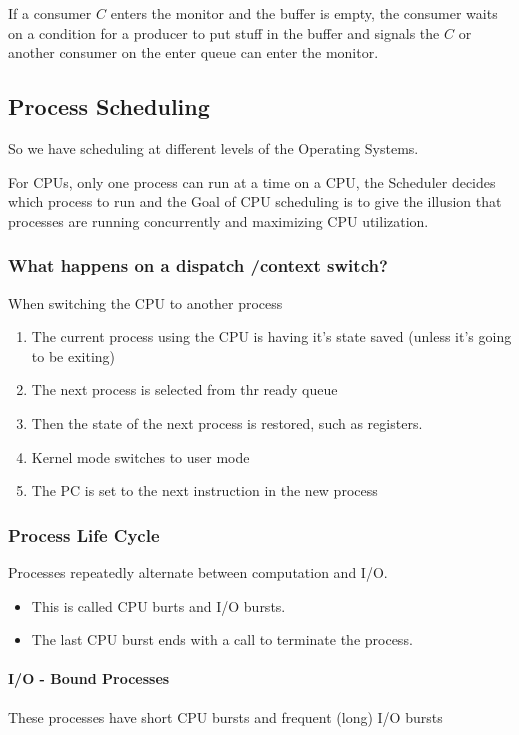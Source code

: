 \documentclass{article}
\begin{document}
If a consumer $C$ enters the monitor and the buffer is empty, the consumer waits on a condition for a producer to put stuff in the buffer and signals the $C$ or another consumer on the enter queue can enter the monitor.

\subsection{Process Scheduling}

So we have scheduling at different levels of the Operating Systems.

For CPUs, only one process can run at a time on a CPU, the Scheduler decides which process to run and the Goal of CPU scheduling is to give the illusion that processes are running concurrently and maximizing CPU utilization.

\subsubsection{What happens on a dispatch \slash context switch?}

When switching the CPU to another process
\begin{enumerate}
  \item The current process using the CPU is having it's state saved (unless it's going to be exiting)
  \item The next process is selected from thr ready queue
  \item Then the state of the next process is restored, such as registers.
  \item Kernel mode switches to user mode
  \item The PC is set to the next instruction in the new process
\end{enumerate}

\subsubsection{Process Life Cycle}

Processes repeatedly alternate between computation and I\slash O.
\begin{itemize}
  \item This is called CPU burts and I\slash O bursts.
  \item The last CPU burst ends with a call to terminate the process.
\end{itemize}

\paragraph{I\slash O - Bound Processes} These processes have short CPU bursts and frequent (long) I\slash O bursts
\end{document}
